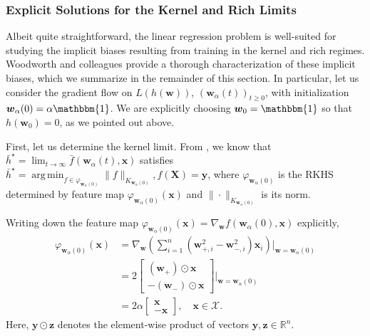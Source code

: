 \documentclass{article}
\DeclareMathOperator*{\argmin}{arg\,min}
\begin{document}
\subsubsection{Explicit Solutions for the Kernel and Rich Limits}
Albeit quite straightforward, the linear regression problem is well-suited for studying the implicit biases resulting from training in the kernel and rich regimes. Woodworth and colleagues provide a thorough characterization of these implicit biases, which we summarize in the remainder of this section. In particular, let us consider the gradient flow on $L(h(\boldsymbol{w}))$, $(\boldsymbol{w}_{\alpha}(t))_{t \geq 0}$, with initialization $\boldsymbol{w}_{\alpha}(0) = \alpha \mathbbm{1}$. We are explicitly choosing $\boldsymbol{w}_0 = \mathbbm{1}$ so that $h(\boldsymbol{w}_0) = 0$, as we pointed out above.

First, let us determine the kernel limit. From \cite{woodworth2020kernel}, we know that $\bar{h}^{\star} = \lim_{t \to \infty} \bar{f}(\boldsymbol{w}_{\alpha}(t), \boldsymbol{x})$ satisfies $\bar{h}^{\star} = \argmin_{f \in \varphi_{\boldsymbol{w}_{\alpha}(0)}} \| f \|_{K_{\boldsymbol{w}_{\alpha}(0)}}, f(\boldsymbol{X}) = \boldsymbol{y}$, where $\varphi_{\boldsymbol{w}_{\alpha}(0)}$ is the RKHS determined by feature map $\varphi_{\boldsymbol{w}_{\alpha}(0)}(\boldsymbol{x})$ and $\| \cdot \|_{K_{\boldsymbol{w}_{\alpha}(0)}}$ is its norm. 

Writing down the feature map $\varphi_{\boldsymbol{w}_{\alpha}(0)}(\boldsymbol{x}) = \nabla_{\boldsymbol{w}} f(\boldsymbol{w}_{\alpha}(0), \boldsymbol{x})$ explicitly, 
\begin{align*}
    \varphi_{\boldsymbol{w}_{\alpha}(0)}(\boldsymbol{x}) &= \nabla_{\boldsymbol{w}}\left( \sum_{i=1}^n(\boldsymbol{w}_{+, i}^2 - \boldsymbol{w}_{-, i}^2)\boldsymbol{x}_i \right)\bigg|_{\boldsymbol{w} = \boldsymbol{w}_{\alpha}(0)}\\
    &= 2\begin{bmatrix}
        (\boldsymbol{w}_+) \odot \boldsymbol{x}\\
        -(\boldsymbol{w}_-) \odot \boldsymbol{x}
    \end{bmatrix} \bigg|_{\boldsymbol{w} = \boldsymbol{w}_{\alpha}(0)}\\
    &= 2\alpha \begin{bmatrix}
        \boldsymbol{x}\\
        -\boldsymbol{x}
    \end{bmatrix}, \quad \boldsymbol{x} \in \mathcal{X}.
\end{align*}
Here, $\boldsymbol{y} \odot \boldsymbol{z}$ denotes the element-wise product of vectors $\boldsymbol{y}, \boldsymbol{z} \in \mathbb{R}^n$. 
\end{document}
